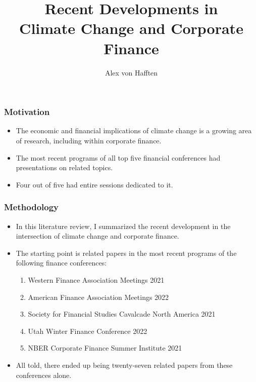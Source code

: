 \documentclass[handout]{beamer}
\title[Climate Change and Corporate Finance]{Recent Developments in \\ Climate Change and Corporate Finance}
\author{Alex von Hafften}
\institute{UW-Madison}
\begin{document}
\begin{frame}
\titlepage
\end{frame}

\begin{frame}
\frametitle{Motivation}
\begin{itemize}[<+->]
\item The economic and financial implications of climate change is a growing area of research, including within corporate finance.
\bigskip
\item The most recent programs of all top five financial conferences had presentations on related topics.
\bigskip
\item Four out of five had entire sessions dedicated to it.
\end{itemize}
\end{frame}



\begin{frame}
\frametitle{Methodology}
\begin{itemize}[<+->]
\item In this literature review, I summarized the recent development in the intersection of climate change and corporate finance.
\bigskip
\item The starting point is related papers in the most recent programs of the following finance conferences:
\begin{enumerate}
\item Western Finance Association Meetings 2021
\item American Finance Association Meetings 2022
\item Society for Financial Studies Cavalcade North America 2021
\item Utah Winter Finance Conference 2022
\item NBER Corporate Finance Summer Institute 2021
\end{enumerate}
\bigskip
\item All told, there ended up being twenty-seven related papers from these conferences alone.
\end{itemize}
\end{frame}
\end{document}
